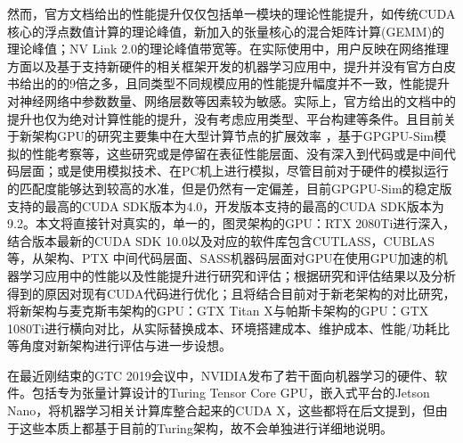 \par 然而，官方文档给出的性能提升仅仅包括单一模块的理论性能提升，如传统CUDA核心的浮点数值计算的理论峰值，新加入的张量核心的混合矩阵计算(GEMM)的理论峰值；NV Link 2.0的理论峰值带宽等。在实际使用中，用户反映在网络推理方面以及基于支持新硬件的相关框架开发的机器学习应用中，提升并没有官方白皮书给出的的9倍之多\parencite{VOLTAWHITEPAPER}，且同类型不同规模应用的性能提升幅度并不一致，性能提升对神经网络中参数数量、网络层数等因素较为敏感。实际上，官方给出的文档中的提升也仅为绝对计算性能的提升，没有考虑应用类型、平台构建等条件。且目前关于新架构GPU的研究主要集中在大型计算节点的扩展效率 \parencite{EXASCLEDL}，基于GPGPU-Sim模拟的性能考察等\parencite{MODELING}，这些研究或是停留在表征性能层面、没有深入到代码或是中间代码层面；或是使用模拟技术、在PC机上进行模拟，尽管目前对于硬件的模拟运行的匹配度能够达到较高的水准，但是仍然有一定偏差，目前GPGPU-Sim的稳定版支持的最高的CUDA SDK版本为4.0，开发版本支持的最高的CUDA SDK版本为9.2。本文将直接针对真实的，单一的，图灵架构的GPU：RTX 2080Ti进行深入，结合版本最新的CUDA SDK 10.0以及对应的软件库包含CUTLASS，CUBLAS等，从架构、PTX 中间代码层面、SASS机器码层面对GPU在使用GPU加速的机器学习应用中的性能以及性能提升进行研究和评估；根据研究和评估结果以及分析得到的原因对现有CUDA代码进行优化；且将结合目前对于新老架构的对比研究\parencite{GRAVITATIONAL}，将新架构与麦克斯韦架构的GPU：GTX Titan X与帕斯卡架构的GPU：GTX 1080Ti进行横向对比，从实际替换成本、环境搭建成本、维护成本、性能/功耗比等角度对新架构进行评估与进一步设想。
\par 在最近刚结束的GTC 2019会议中，NVIDIA发布了若干面向机器学习的硬件、软件。包括专为张量计算设计的Turing Tensor Core GPU，嵌入式平台的Jetson Nano\parencite{JETSONNANO}，将机器学习相关计算库整合起来的CUDA X\parencite{CUDAX}，这些都将在后文提到，但由于这些本质上都基于目前的Turing架构，故不会单独进行详细地说明。
